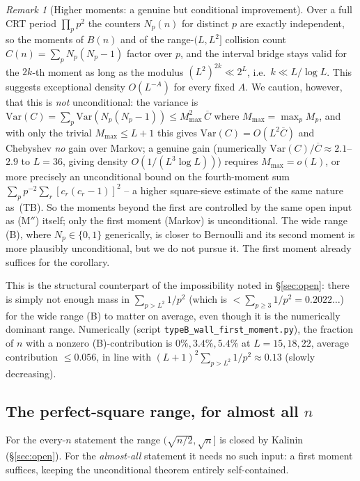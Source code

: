 \documentclass[11pt]{article}
\theoremstyle{plain}
\theoremstyle{definition}
\theoremstyle{remark}
\newtheorem{remark}[theorem]{Remark}
\begin{document}
\begin{remark}[Higher moments: a genuine but conditional improvement]
Over a full CRT period $\prod_pp^2$ the counters $N_p(n)$ for distinct $p$ are
exactly independent, so the moments of $B(n)$ and of the range-$(L,L^2]$
collision count $C(n)=\sum_pN_p(N_p-1)$ factor over $p$, and the interval bridge
stays valid for the $2k$-th moment as long as the modulus $(L^2)^{2k}\ll2^L$,
i.e.\ $k\ll L/\log L$. This suggests exceptional density $O(L^{-A})$ for every
fixed $A$. We caution, however, that this is \emph{not} unconditional: the
variance is $\mathrm{Var}(C)=\sum_p\mathrm{Var}(N_p(N_p-1))\le M_{\max}^2\,
\overline C$ where $M_{\max}=\max_pM_p$, and with only the trivial
$M_{\max}\le L+1$ this gives $\mathrm{Var}(C)=O(L^2\overline C)$ and Chebyshev
\emph{no} gain over Markov; a genuine gain (numerically $\mathrm{Var}(C)/
\overline C\approx2.1$--$2.9$ to $L=36$, giving density $O(1/(L^3\log L))$)
requires $M_{\max}=o(L)$, or more precisely an unconditional bound on the
fourth-moment sum $\sum_p p^{-2}\sum_r[c_r(c_r-1)]^2$ -- a higher square-sieve
estimate of the same nature as~(TB). So the moments beyond the first are
controlled by the same open input as (M$''$) itself; only the first moment
(Markov) is unconditional. The wide range (B), where $N_p\in\{0,1\}$ generically,
is closer to Bernoulli and its second moment is more plausibly unconditional, but
we do not pursue it. The first moment already suffices for the corollary.
\end{remark}

This is the structural counterpart of the impossibility noted in
\S\ref{sec:open}: there is simply not enough mass in $\sum_{p>L^2}1/p^2$
(which is $<\sum_{p\ge3}1/p^2=0.2022\ldots$) for the wide range (B) to matter
on average, even though it is the numerically dominant range. Numerically
(script \texttt{typeB\_wall\_first\_moment.py}), the fraction of $n$ with a nonzero (B)-contribution
is $0\%,3.4\%,5.4\%$ at $L=15,18,22$, average contribution $\le0.056$, in line
with $(L+1)^2\sum_{p>L^2}1/p^2\approx0.13$ (slowly decreasing).

\subsection{The perfect-square range, for almost all $n$}

For the every-$n$ statement the range $(\sqrt{n/2},\sqrt n]$ is closed by
Kalinin~\cite{Kalinin2026} (\S\ref{sec:open}). For the \emph{almost-all}
statement it needs no such input: a first moment suffices, keeping the
unconditional theorem entirely self-contained.
\end{document}
